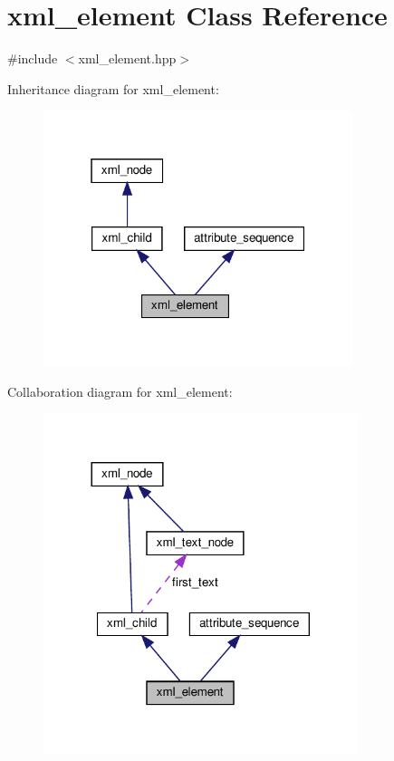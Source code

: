 \hypertarget{classxml__element}{}\section{xml\+\_\+element Class Reference}
\label{classxml__element}


{\ttfamily \#include $<$xml\+\_\+element.\+hpp$>$}



Inheritance diagram for xml\+\_\+element\+:
\nopagebreak
\begin{figure}[H]
\begin{center}
\leavevmode
\includegraphics[width=256pt]{db/dc1/classxml__element__inherit__graph}
\end{center}
\end{figure}


Collaboration diagram for xml\+\_\+element\+:
\nopagebreak
\begin{figure}[H]
\begin{center}
\leavevmode
\includegraphics[width=260pt]{d4/d91/classxml__element__coll__graph}
\end{center}
\end{figure}
